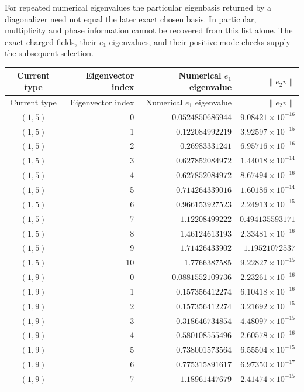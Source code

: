 For repeated numerical eigenvalues the particular eigenbasis returned
by a diagonalizer need not equal the later exact chosen basis. In
particular, multiplicity and phase information cannot be recovered
from this list alone. The exact charged fields, their $e_1$
eigenvalues, and their positive-mode checks supply the subsequent
selection.

\begingroup\small
\begin{longtable}{@{}crrr@{}}
\toprule Current type&Eigenvector index&Numerical $e_1$ eigenvalue&$\|e_2v\|$\\\midrule\endfirsthead
\toprule Current type&Eigenvector index&Numerical $e_1$ eigenvalue&$\|e_2v\|$\\\midrule\endhead
\bottomrule\endfoot
$(1,5)$ & 0 & $0.0524850686944$ & $9.08421\times10^{-16}$\\
$(1,5)$ & 1 & $0.122084992219$ & $3.92597\times10^{-15}$\\
$(1,5)$ & 2 & $0.26983331241$ & $6.95716\times10^{-16}$\\
$(1,5)$ & 3 & $0.627852084972$ & $1.44018\times10^{-14}$\\
$(1,5)$ & 4 & $0.627852084972$ & $8.67494\times10^{-16}$\\
$(1,5)$ & 5 & $0.714264339016$ & $1.60186\times10^{-14}$\\
$(1,5)$ & 6 & $0.966153927523$ & $2.24913\times10^{-15}$\\
$(1,5)$ & 7 & $1.12208499222$ & $0.494135593171$\\
$(1,5)$ & 8 & $1.46124613193$ & $2.33481\times10^{-16}$\\
$(1,5)$ & 9 & $1.71426433902$ & $1.19521072537$\\
$(1,5)$ & 10 & $1.7766387585$ & $9.22827\times10^{-15}$\\
$(1,9)$ & 0 & $0.0881552109736$ & $2.23261\times10^{-16}$\\
$(1,9)$ & 1 & $0.157356412274$ & $6.10418\times10^{-16}$\\
$(1,9)$ & 2 & $0.157356412274$ & $3.21692\times10^{-15}$\\
$(1,9)$ & 3 & $0.318646734854$ & $4.48097\times10^{-15}$\\
$(1,9)$ & 4 & $0.580108555496$ & $2.60578\times10^{-16}$\\
$(1,9)$ & 5 & $0.738001573564$ & $6.55504\times10^{-15}$\\
$(1,9)$ & 6 & $0.775315891617$ & $6.97350\times10^{-17}$\\
$(1,9)$ & 7 & $1.18961447679$ & $2.41474\times10^{-15}$\\

\end{longtable}
